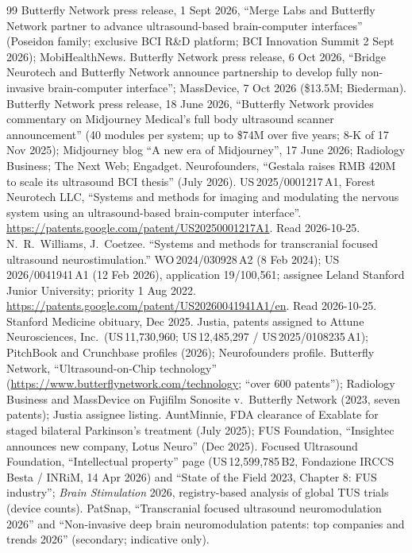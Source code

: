 \documentclass[11pt,a4paper]{article}
\begin{document}
\begin{thebibliography}{99}
 Butterfly Network press release, 1 Sept 2026, ``Merge Labs and Butterfly Network partner to advance ultrasound-based brain-computer interfaces'' (Poseidon family; exclusive BCI R\&D platform; BCI Innovation Summit 2 Sept 2026); MobiHealthNews.
 Butterfly Network press release, 6 Oct 2026, ``Bridge Neurotech and Butterfly Network announce partnership to develop fully non-invasive brain-computer interface''; MassDevice, 7 Oct 2026 (\$13.5M; Biederman).
 Butterfly Network press release, 18 June 2026, ``Butterfly Network provides commentary on Midjourney Medical's full body ultrasound scanner announcement'' (40 modules per system; up to \$74M over five years; 8-K of 17 Nov 2025); Midjourney blog ``A new era of Midjourney'', 17 June 2026; Radiology Business; The Next Web; Engadget.
 Neurofounders, ``Gestala raises RMB 420M to scale its ultrasound BCI thesis'' (July 2026).
 US\,2025/0001217\,A1, Forest Neurotech LLC, ``Systems and methods for imaging and modulating the nervous system using an ultrasound-based brain-computer interface''. \url{https://patents.google.com/patent/US20250001217A1}. Read 2026-10-25.
 N.~R.~Williams, J.~Coetzee. ``Systems and methods for transcranial focused ultrasound neurostimulation.'' WO\,2024/030928\,A2 (8 Feb 2024); US\,2026/0041941\,A1 (12 Feb 2026), application 19/100,561; assignee Leland Stanford Junior University; priority 1 Aug 2022. \url{https://patents.google.com/patent/US20260041941A1/en}. Read 2026-10-25. Stanford Medicine obituary, Dec 2025.
 Justia, patents assigned to Attune Neurosciences, Inc.\ (US\,11,730,960; US\,12,485,297 / US\,2025/0108235\,A1); PitchBook and Crunchbase profiles (2026); Neurofounders profile.
 Butterfly Network, ``Ultrasound-on-Chip technology'' (\url{https://www.butterflynetwork.com/technology}; ``over 600 patents''); Radiology Business and MassDevice on Fujifilm Sonosite v.\ Butterfly Network (2023, seven patents); Justia assignee listing.
 AuntMinnie, FDA clearance of Exablate for staged bilateral Parkinson's treatment (July 2025); FUS Foundation, ``Insightec announces new company, Lotus Neuro'' (Dec 2025).
 Focused Ultrasound Foundation, ``Intellectual property'' page (US\,12,599,785\,B2, Fondazione IRCCS Besta / INRiM, 14 Apr 2026) and ``State of the Field 2023, Chapter 8: FUS industry''; \emph{Brain Stimulation} 2026, registry-based analysis of global TUS trials (device counts).
 PatSnap, ``Transcranial focused ultrasound neuromodulation 2026'' and ``Non-invasive deep brain neuromodulation patents: top companies and trends 2026'' (secondary; indicative only).

\end{thebibliography}
\end{document}
